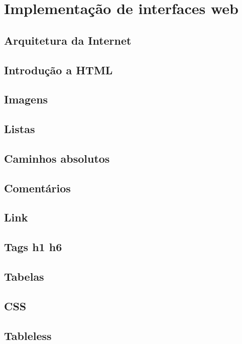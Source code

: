 \section{Implementação de interfaces web}

\subsection{Arquitetura da Internet}

\subsection{Introdução a HTML}

\subsection{Imagens}

\subsection{Listas}

\subsection{Caminhos absolutos}

\subsection{Comentários}

\subsection{Link}

\subsection{Tags h1 h6}

\subsection{Tabelas}

\subsection{CSS}

\subsection{Tableless}

